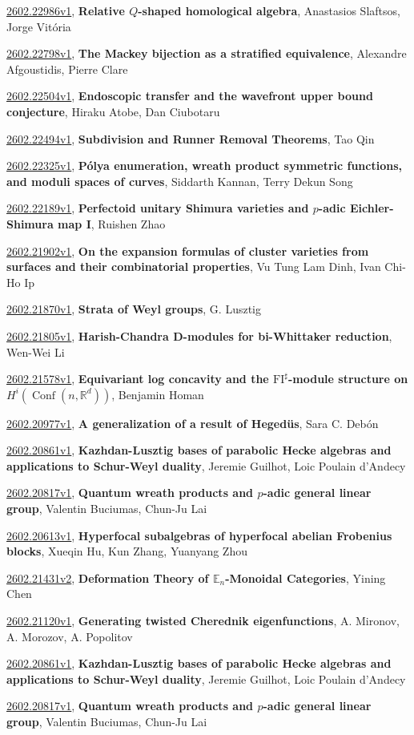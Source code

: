 \documentclass[9pt, a4paper]{article}
\theoremstyle{plain}
\theoremstyle{definition}
\theoremstyle{remark}
\newcommand{\arxiv}[3]{\href{https://arxiv.org/abs/#1}{#1}, \textbf{\textcolor{arxivblue}{#2}}, #3}
\begin{document}
\arxiv{2602.22986v1}{Relative $Q$-shaped homological algebra}{Anastasios Slaftsos, Jorge Vitória}

\arxiv{2602.22798v1}{The Mackey bijection as a stratified equivalence}{Alexandre Afgoustidis, Pierre Clare}

\arxiv{2602.22504v1}{Endoscopic transfer and the wavefront upper bound conjecture}{Hiraku Atobe, Dan Ciubotaru}

\arxiv{2602.22494v1}{Subdivision and Runner Removal Theorems}{Tao Qin}

\arxiv{2602.22325v1}{Pólya enumeration, wreath product symmetric functions, and moduli spaces of curves}{Siddarth Kannan, Terry Dekun Song}

\arxiv{2602.22189v1}{Perfectoid unitary Shimura varieties and $p$-adic Eichler-Shimura map I}{Ruishen Zhao}

\arxiv{2602.21902v1}{On the expansion formulas of cluster varieties from surfaces and their combinatorial properties}{Vu Tung Lam Dinh, Ivan Chi-Ho Ip}

\arxiv{2602.21870v1}{Strata of Weyl groups}{G. Lusztig}

\arxiv{2602.21805v1}{Harish-Chandra D-modules for bi-Whittaker reduction}{Wen-Wei Li}

\arxiv{2602.21578v1}{Equivariant log concavity and the $\operatorname{FI^\sharp}$-module structure on $H^i(\operatorname{Conf}(n,\mathbb{R}^d))$}{Benjamin Homan}

\arxiv{2602.20977v1}{A generalization of a result of Hegedüs}{Sara C. Debón}

\arxiv{2602.20861v1}{Kazhdan-Lusztig bases of parabolic Hecke algebras and applications to Schur-Weyl duality}{Jeremie Guilhot, Loic Poulain d'Andecy}

\arxiv{2602.20817v1}{Quantum wreath products and $p$-adic general linear group}{Valentin Buciumas, Chun-Ju Lai}

\arxiv{2602.20613v1}{Hyperfocal subalgebras of hyperfocal abelian Frobenius blocks}{Xueqin Hu, Kun Zhang, Yuanyang Zhou}

\arxiv{2602.21431v2}{Deformation Theory of $\mathbb{E}_n$-Monoidal Categories}{Yining Chen}

\arxiv{2602.21120v1}{Generating twisted Cherednik eigenfunctions}{A. Mironov, A. Morozov, A. Popolitov}

\arxiv{2602.20861v1}{Kazhdan-Lusztig bases of parabolic Hecke algebras and applications to Schur-Weyl duality}{Jeremie Guilhot, Loic Poulain d'Andecy}

\arxiv{2602.20817v1}{Quantum wreath products and $p$-adic general linear group}{Valentin Buciumas, Chun-Ju Lai}

\end{document}
